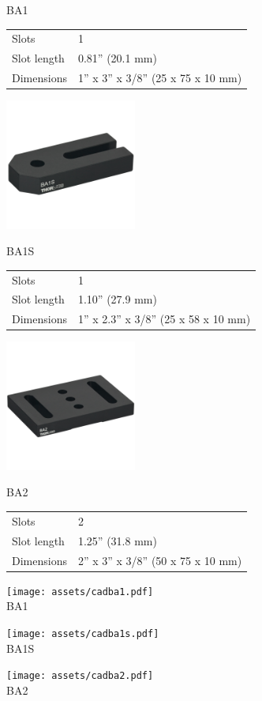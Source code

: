 \documentclass{article}
\begin{document}
\begin{multicols}{2}
\noindent BA1

\begin{tabular}{|l|l|}
Slots & 1 \\
Slot length & 0.81'' (20.1 mm)\\
Dimensions & 1'' x 3'' x 3/8'' (25 x 75 x 10 mm)\\
\end{tabular}%

\begin{center}
\includegraphics[width=4.3cm]{assets/ba1s.jpg}
\end{center}

\noindent BA1S

\begin{tabular}{|l|l|}
Slots & 1\\
Slot length & 1.10'' (27.9 mm)\\
Dimensions & 1'' x 2.3'' x 3/8'' (25 x 58 x 10 mm)\\
\end{tabular}%

\begin{center}
\includegraphics[width=4.3cm]{assets/ba2.jpg}
\end{center}

\noindent BA2

\begin{tabular}{|l|l|}
Slots & 2\\
Slot length & 1.25'' (31.8 mm)\\
Dimensions & 2'' x 3'' x 3/8'' (50 x 75 x 10 mm)\\
\end{tabular}%




\end{multicols}

\begin{center}
\texttt{[image: assets/cadba1.pdf]} \\
\textsf{BA1}
\end{center}

\begin{center}
\texttt{[image: assets/cadba1s.pdf]} \\
\textsf{BA1S}
\end{center}

\begin{center}
\texttt{[image: assets/cadba2.pdf]} \\
\textsf{BA2}
\end{center}
\end{document}
